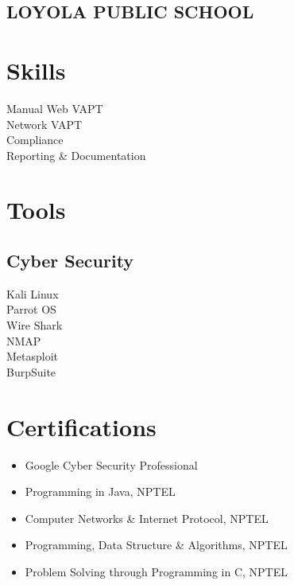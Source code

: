 \documentclass[]{roshan-resume}
\begin{document}
\begin{minipage}[t]{0.33\textwidth}
		\subsection{LOYOLA PUBLIC SCHOOL}
		
		
		
		
		\section{Skills}
		\textbullet{} Manual Web VAPT \\ 
		\textbullet{} Network VAPT \\
		\textbullet{} Compliance \\
		\textbullet{} Reporting \& Documentation	
		
		\section{Tools}
		\subsection{Cyber Security}
		\textbullet{} Kali Linux \\
		\textbullet{} Parrot OS \\
		\textbullet{} Wire Shark \\
		\textbullet{} NMAP \\
		\textbullet{} Metasploit \\
		\textbullet{} BurpSuite
		
		\section{Certifications}
		\begin{itemize}
			\item Google Cyber Security Professional
			\item Programming in Java, NPTEL
			\item Computer Networks \& Internet Protocol, NPTEL
			\item Programming, Data Structure \& Algorithms, NPTEL
			\item Problem Solving through Programming in C, NPTEL
		\end{itemize}
		
		
		
	\end{minipage} 
\end{document}
